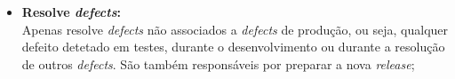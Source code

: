 \begin{itemize}
\begin{itemize}
                        \item \textbf{Resolve \textit{defects}:} \\
                        Apenas resolve \textit{defects} não associados a \textit{defects} de produção, ou seja, qualquer defeito detetado em testes, durante o desenvolvimento ou durante a resolução de outros \textit{defects}. São também responsáveis por preparar a nova \textit{release};
                    \end{itemize}

                    \begin{comment}
                        
                    
                        O versionamento do projeto rege-se por \textit{majors}, \textit{minors} e \textit{hotfixes}, correspondendo respetivamente a cada um dos números da seguinte versão de exemplo: 2.3.1. Onde \textit{majors} são novas versões grandes da aplicação que trazem bastantes novas funcionalidades, se houvesse, por exemplo, uma mudança total da interface, seria uma nova major. Minors são alterações à aplicação não tão grandes como uma major, por exemplo uma alteração apenas na forma como se fazem os placements ou outra area da aplicação. E hotfixes são correções de problemas ou bugs da aplicação que são importantes conseguir distribuir rapidamente, como por exemplo, correção de uma vulnerabilidade de segurança ou defeito. 
                    \end{comment}
                    
                    \begin{comment}
                        Temos 3 equipas mais uma que é a surge, cada equipa liderada por um team leader. O Letras é um XP mas funciona como team leader para o surge

                        A triagem é uma delas e essa eu explico bem, equipa para responder aos incidentes e aos requests abbertos pelos utilizadores

                        Equipa Lights On, responsável pelas tarefas semanais, mas esta equipa também resolve defects de Market, defects que foram abertos com base em incidentes.

                        Equipa defects - Equipa que só resolve defects de não market, ou seja, que não têm incidentes, por exemplo defects abertos pelos testesr na fase de testes.

                        Nuxeo
                    \end{comment}


\end{itemize}
